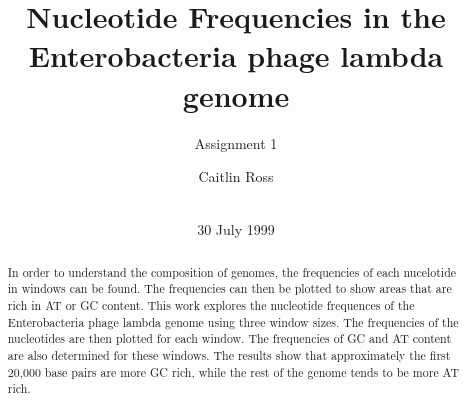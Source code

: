 \documentclass{acm_proc_article-sp}
\begin{document}
\title{Nucleotide Frequencies in the Enterobacteria phage lambda genome}
\subtitle{Assignment 1}
%
%
%
%
%

%
\author{
	\alignauthor Caitlin Ross\\
	 \\
}

\date{30 July 1999}

\maketitle

\begin{abstract}
	In order to understand the composition of genomes, the frequencies of each nucelotide in windows can be found.  The frequencies can then be plotted to show areas that are rich in AT or GC content.  This work explores the nucleotide frequences of the Enterobacteria phage lambda genome using three window sizes.  The frequencies of the nucleotides are then plotted for each window.  The frequencies of GC and AT content are also determined for these windows.  The results show that approximately the first 20,000 base pairs are more GC rich, while the rest of the genome tends to be more AT rich.
\end{abstract}
\end{document}
